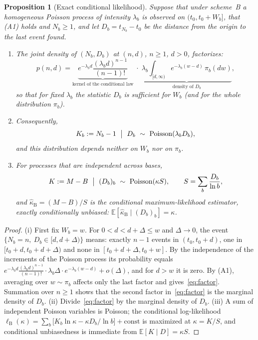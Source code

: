 \documentclass[11pt,a4paper]{article}
\theoremstyle{plain}
\newtheorem{proposition}{Proposition}
\theoremstyle{remark}
\DeclareMathOperator{\Pois}{Poisson}
\begin{document}
\begin{proposition}[Exact conditional likelihood]\label{prop:cond}
Suppose that under scheme~B a homogeneous Poisson process of intensity
$\lambda_b$ is observed on $(t_0,t_0+W_b]$, that (A1) holds and $N_b\ge1$, and
let $D_b=t_{N_b}-t_0$ be the distance from the origin to the last event found.
\begin{enumerate}
\item[\rm(i)] The joint density of $(N_b,D_b)$ at $(n,d)$, $n\ge1$, $d>0$,
factorizes:
\begin{equation}\label{eq:factor}
p(n,d)=\underbrace{e^{-\lambda_bd}\frac{(\lambda_bd)^{n-1}}{(n-1)!}}_{\text{kernel of the conditional law}}
\;\cdot\;
\underbrace{\lambda_b\int_{[d,\infty)}e^{-\lambda_b(w-d)}\,\pi_b(dw)}_{\text{density of }D_b},
\end{equation}
so that for fixed $\lambda_b$ the statistic $D_b$ is sufficient for $W_b$ (and
for the whole distribution $\pi_b$).
\item[\rm(ii)] Consequently,
\begin{equation}\label{eq:condlaw}
K_b:=N_b-1\ \bigm|\ D_b\ \sim\ \Pois(\lambda_b D_b),
\end{equation}
and this distribution depends neither on $W_b$ nor on $\pi_b$.
\item[\rm(iii)] For processes that are independent across bases,
\begin{equation}\label{eq:pivotB}
K:=M-B\ \bigm|\ (D_b)_{b}\ \sim\ \Pois(\kappa S),\qquad
S=\sum_b\frac{D_b}{\ln b},
\end{equation}
and $\hat\kappa_{\mathrm B}=(M-B)/S$ is the conditional maximum-likelihood
estimator, exactly conditionally unbiased:
$\mathbb E[\hat\kappa_{\mathrm B}\mid (D_b)_b]=\kappa$.
\end{enumerate}
\end{proposition}

\begin{proof}
(i) First fix $W_b=w$. For $0<d<d+\Delta\le w$ and $\Delta\to0$, the event
$\{N_b=n,\ D_b\in[d,d+\Delta)\}$ means: exactly $n-1$ events in $(t_0,t_0+d)$,
one in $[t_0+d,t_0+d+\Delta)$ and none in $[t_0+d+\Delta,t_0+w]$. By the
independence of the increments of the Poisson process its probability equals
$e^{-\lambda_bd}\frac{(\lambda_bd)^{n-1}}{(n-1)!}\cdot\lambda_b\Delta\cdot
e^{-\lambda_b(w-d)}+o(\Delta)$, and for $d>w$ it is zero. By (A1), averaging
over $w\sim\pi_b$ affects only the last factor and gives~\eqref{eq:factor}.
Summation over $n\ge1$ shows that the second factor in~\eqref{eq:factor} is the
marginal density of $D_b$.
(ii) Divide~\eqref{eq:factor} by the marginal density of $D_b$.
(iii) A sum of independent Poisson variables is Poisson; the conditional
log-likelihood $\ell_{\mathrm B}(\kappa)=\sum_b\bigl[K_b\ln\kappa-\kappa D_b/\ln b\bigr]
+\mathrm{const}$ is maximized at $\kappa=K/S$, and conditional unbiasedness is
immediate from $\mathbb E[K\mid D]=\kappa S$.
\end{proof}
\end{document}
